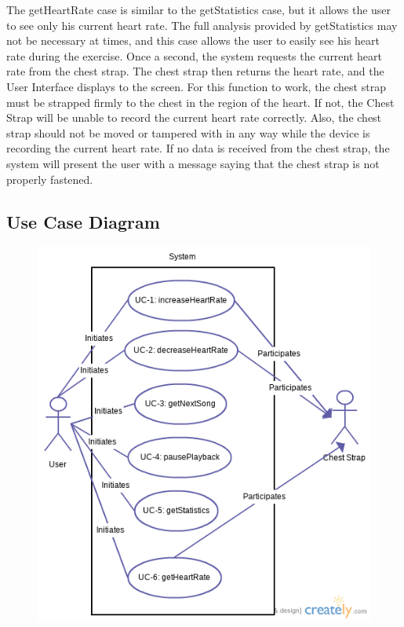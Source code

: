 \documentclass[letterpaper,english, 12pt]{scrreprt}
\begin{document}
The getHeartRate case is similar to the getStatistics case, but it allows the user to see only his current heart rate. The full analysis provided by getStatistics may not be necessary at times, and this case allows the user to easily see his heart rate during the exercise.
Once a second, the system requests the current heart rate from the chest strap. The chest strap then returns the heart rate, and the User Interface displays to the screen.
For this function to work, the chest strap must be strapped firmly to the chest in the region of the heart. If not, the Chest Strap will be unable to record the current heart rate correctly. Also, the chest strap should not be moved or tampered with in any way while the device is recording the current heart rate.
If no data is received from the chest strap, the system will present the user with a message saying that the chest strap is not properly fastened.



\subsection{Use Case Diagram}
\begin{figure}[H]
	\centering
	\includegraphics{img/use_case.png}\\
\end{figure}
\end{document}
